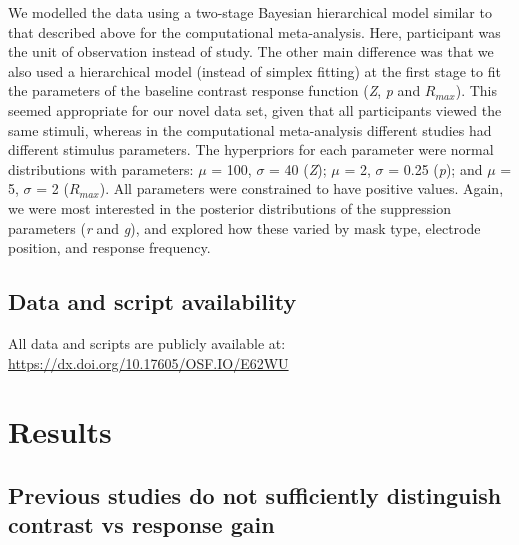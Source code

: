 \documentclass[]{article}
\begin{document}
We modelled the data using a two-stage Bayesian hierarchical model similar to that described above for the computational meta-analysis. Here, participant was the unit of observation instead of study. The other main difference was that we also used a hierarchical model (instead of simplex fitting) at the first stage to fit the parameters of the baseline contrast response function (\emph{Z}, \emph{p} and \(R_{max}\)). This seemed appropriate for our novel data set, given that all participants viewed the same stimuli, whereas in the computational meta-analysis different studies had different stimulus parameters. The hyperpriors for each parameter were normal distributions with parameters: \(\mu\) = 100, \(\sigma\) = 40 (\emph{Z}); \(\mu\) = 2, \(\sigma\) = 0.25 (\emph{p}); and \(\mu\) = 5, \(\sigma\) = 2 (\(R_{max}\)). All parameters were constrained to have positive values. Again, we were most interested in the posterior distributions of the suppression parameters (\emph{r} and \emph{g}), and explored how these varied by mask type, electrode position, and response frequency.

\hypertarget{data-and-script-availability}{%
\subsection{Data and script availability}\label{data-and-script-availability}}

All data and scripts are publicly available at: \href{https://osf.io/e62wu/}{https://dx.doi.org/10.17605/OSF.IO/E62WU}

\hypertarget{results}{%
\section{Results}\label{results}}

\hypertarget{previous-studies-do-not-sufficiently-distinguish-contrast-vs-response-gain}{%
\subsection{Previous studies do not sufficiently distinguish contrast vs response gain}\label{previous-studies-do-not-sufficiently-distinguish-contrast-vs-response-gain}}
\end{document}
